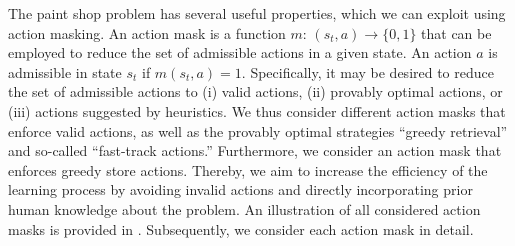 \documentclass[11pt]{elsarticle}
\begin{document}
The paint shop problem has several useful properties, which we can exploit using action masking. 
An action mask is a function $m{:}\,(s_t,a)\rightarrow \{0,1\}$ that can be employed to reduce the set of admissible actions in a given state. An action $a$ is admissible in state $s_t$ if $m(s_t,a)=1$. Specifically, it may be desired to reduce the set of admissible actions to (i) valid actions, (ii) provably optimal actions, or (iii) actions suggested by heuristics. We thus consider different action masks that enforce valid actions, as well as the provably optimal strategies ``greedy retrieval'' and so-called ``fast-track actions.'' Furthermore, we consider an action mask that enforces greedy store actions. Thereby, we aim to increase the efficiency of the learning process by avoiding invalid actions and directly incorporating prior human knowledge about the problem. An illustration of all considered action masks is provided in . Subsequently, we consider each action mask in detail.
\end{document}

